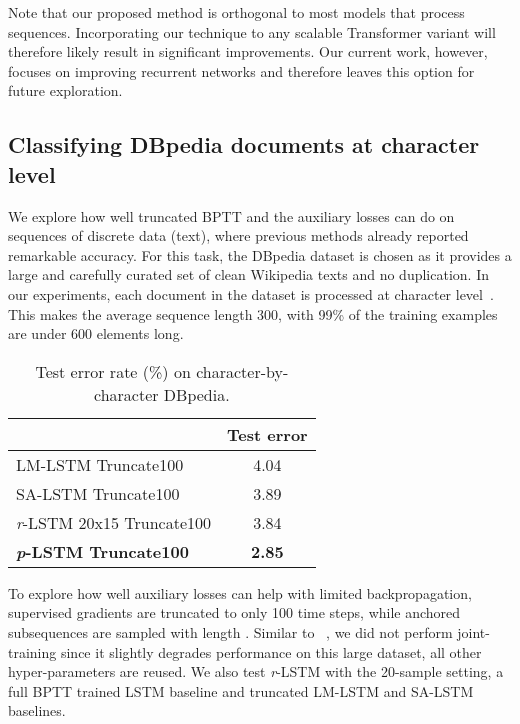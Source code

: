 \documentclass{article}
\newcommand{\rlstm}{{\it r}-LSTM}
\newcommand{\plstm}{{\it p}-LSTM}
\begin{document}
Note that our proposed method is orthogonal to most models that process sequences. Incorporating our technique to any scalable Transformer variant will therefore likely result in significant improvements. Our current work, however, focuses on improving recurrent networks and therefore leaves this option for future exploration.

\subsection{Classifying DBpedia documents at character level}

We explore how well truncated BPTT and the auxiliary losses can do on sequences of discrete data (text), where previous methods already reported remarkable accuracy. For this task, the DBpedia dataset is chosen as it provides a large and carefully curated set of clean Wikipedia texts and no duplication. In our experiments, each document in the dataset is processed at character level~\cite{zhang2015text}. This makes the average sequence length 300, with 99\% of the training examples are under 600 elements long.

\begin{table}[htb]
\caption{Test error rate (\%) on character-by-character DBpedia.}
\label{tab:dbpedia_truncate}
\vskip 0.15in
\begin{center}
\begin{small}

\begin{tabular}{lc}
\toprule
 & Test error \\ 
\midrule
LM-LSTM Truncate100 & 4.04 \\
SA-LSTM Truncate100 & 3.89 \\
\midrule
\rlstm{} 20x15 Truncate100 & 3.84 \\ \textbf{\plstm{} Truncate100} & \textbf{2.85} \\
\bottomrule
\end{tabular}
\end{small}
\end{center}
\vskip -0.1in
\end{table}


To explore how well auxiliary losses can help with limited backpropagation, supervised gradients are truncated to only 100 time steps, while anchored subsequences are sampled with length . Similar to ~\citet{dai2015semi}, we did not perform joint-training since it slightly degrades performance on this large dataset, all other hyper-parameters are reused. We also test \rlstm{} with the 20-sample setting, a full BPTT trained LSTM baseline and truncated LM-LSTM and SA-LSTM ~\cite{dai2015semi} baselines.
\end{document}
